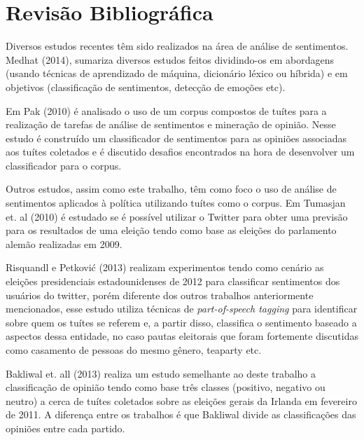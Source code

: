 \chapter{Revisão Bibliográfica}

Diversos estudos recentes têm sido realizados na área de análise de sentimentos.
Medhat (2014)\citep{medhat2014}, sumariza diversos estudos feitos dividindo-os em
abordagens (usando técnicas de aprendizado de máquina, dicionário léxico ou
híbrida) e em objetivos (classificação de sentimentos, detecção de emoções etc).

Em Pak (2010)\citep{pak2010} é analisado o uso de um corpus compostos de tuítes para
a realização de tarefas de análise de sentimentos e mineração de opinião. Nesse estudo
é construído um classificador de sentimentos para as opiniões associadas aos tuítes coletados
e é discutido desafios encontrados na hora de desenvolver um classificador para o corpus.

Outros estudos, assim como este trabalho, têm como foco o uso de análise de sentimentos
aplicados à política utilizando tuítes como o corpus. Em Tumasjan et. al (2010)\citep{tumasjan2010} é estudado
se é possível utilizar o Twitter para obter uma previsão para os resultados de uma eleição
tendo como base as eleições do parlamento alemão realizadas em 2009.

Risquandl e Petković (2013)\citep{petkovic2013} realizam experimentos tendo como cenário as
eleições presidenciais estadounidenses de 2012 para classificar sentimentos dos usuários do
twitter, porém diferente dos outros trabalhos anteriormente mencionados, esse estudo utiliza
técnicas de \textit{part-of-speech tagging} para identificar sobre quem os tuítes se referem e, a
partir disso, classifica o sentimento baseado a aspectos dessa entidade, no caso pautas eleitorais
que foram fortemente discutidas como casamento de pessoas do mesmo gênero, teaparty etc.

Bakliwal et. all (2013)\citep{bakliwal2013} realiza um estudo semelhante ao deste trabalho a classificação de opinião
tendo como base três classes (positivo, negativo ou neutro) a cerca de tuítes coletados sobre
as eleições gerais da Irlanda em fevereiro de 2011. A diferença entre os trabalhos é que Bakliwal
divide as classificações das opiniões entre cada partido.


